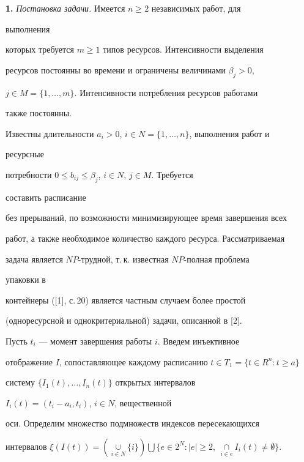  


 


{\bf 1.} {\it Постановка задачи.} Имеется $n\ge2$ независимых работ, для 


выполнения 


которых требуется $m\ge1$ типов ресурсов. Интенсивности выделения 


ресурсов постоянны во времени и ограничены величинами $\beta_j>0$, 


$j\in M=\{1,\dotsc,m\}$. Интенсивности потребления ресурсов работами 


также постоянны. 


Известны длительности $a_i>0$, $i\in N=\{1,\dotsc,n\}$, выполнения работ и 


ресурсные 


потребности $0\le b_{i j}\le\beta_j$, $i\in N$, $j\in M$. Требуется 


составить расписание 


без прерываний, по возможности минимизирующее время завершения всех 




работ, а также необходимое количество каждого ресурса. Рассматриваемая 


задача является $NP$-трудной, т.\,к. известная $NP$-полная проблема 


упаковки в 


контейнеры ([1], с.\,20) является частным случаем более простой 


(одноресурсной и однокритериальной) задачи, описанной в [2]. 


 


Пусть $t_i$ --- момент завершения работы $i$. Введем инъективное 


отображение $I$, сопоставляющее каждому расписанию $t\in T_1=\{t\in 


R^n:t\ge a\}$ 


систему $\{I_1(t),\dotsc,I_n(t)\}$ открытых интервалов 


$I_i(t)=(t_i-a_i,t_i)$, $i\in N$, вещественной 


оси. Определим множество подмножеств индексов пересекающихся 


интервалов $\xi(I(t))=(\mathop{\cup}\limits_{i\in N}\{i\})\bigcup 


\{e\in2^N:|e|\ge2,\ \mathop{\cap}\limits_{i\in e}I_i(t)\ne\emptyset\}$. 


